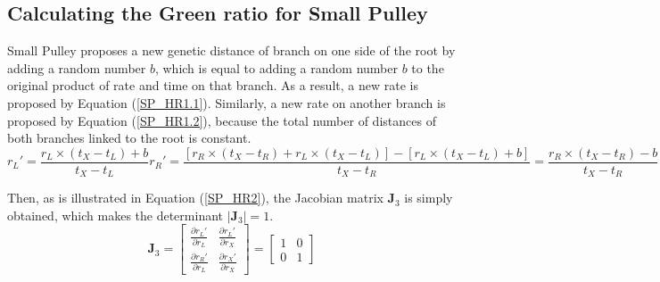 \documentclass{bmcart}
\begin{document}
\begin{backmatter}
\subsection*{Calculating the Green ratio for Small Pulley}
Small Pulley proposes a new genetic distance of branch on one side of the root by adding a random number $b$, which is equal to adding a random number $b$ to the original product of rate and time on that branch. As a result, a new rate is proposed by Equation (\ref{SP_HR1.1}). Similarly, a new rate on another branch is proposed by Equation (\ref{SP_HR1.2}), because the total number of distances of both branches linked to the root is constant.
\begin{subequations}\label{SP_HR1}
\begin{equation}\label{SP_HR1.1}
{r_L}' = \frac{{{r_L} \times ({t_X} - {t_L}) + b}}{{{t_X} - {t_L}}}
\end{equation}
\begin{equation}\label{SP_HR1.2}
{r_R}' = \frac{{[{r_R} \times ({t_X} - {t_R}) + {r_L} \times ({t_X} - {t_L})] - [{r_L} \times ({t_X} - {t_L}) + b]}}{{{t_X} - {t_R}}} = \frac{{{r_R} \times ({t_X} - {t_R}) - b}}{{{t_X} - {t_R}}}
\end{equation}
\end{subequations}

Then, as is illustrated in Equation (\ref{SP_HR2}), the Jacobian matrix ${{\mathbf{J}}_3}$ is simply obtained, which makes the determinant $\left| {{{\mathbf{J}}_3}} \right| = 1$.
\begin{equation}\label{SP_HR2}
{{\mathbf{J}}_3} = \left[ {\begin{array}{*{20}{c}}
  {\frac{{\partial {r_L}'}}{{\partial {r_L}}}}&{\frac{{\partial {r_L}'}}{{\partial {r_X}}}} \\
  {\frac{{\partial {r_R}'}}{{\partial {r_L}}}}&{\frac{{\partial {r_X}'}}{{\partial {r_X}}}}
\end{array}} \right] = \left[ {\begin{array}{*{20}{c}}
  1&0 \\
  0&1
\end{array}} \right]
\end{equation}

\end{backmatter}
\end{document}
